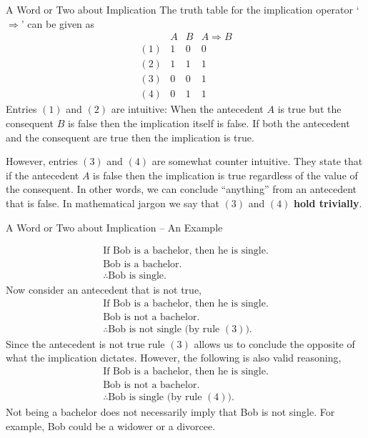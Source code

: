 \documentclass{beamer}
\begin{document}
\begin{frame}{A Word or Two about Implication}
The truth table for the implication operator `$\Rightarrow$' can be given as
{\scriptsize
\[
\begin{array}{lcc|c}
&A & B & A \Rightarrow B\\ \hline
(1)& 1 & 0 & 0\\
(2) & 1 & 1 & 1\\
(3) & 0 & 0 & 1\\
(4) & 0 & 1 & 1
\end{array}
\]
}
Entries $(1)$ and $(2)$ are intuitive: When the antecedent $A$ is true but the consequent $B$ is false then
the implication itself is false.  If both the antecedent and the consequent are true then the implication is true.

\vspace{.1in}

However, entries $(3)$ and $(4)$ are somewhat counter intuitive.  They state that if the antecedent $A$ is false
then the implication is true regardless of the value of the consequent.  In other words, we can conclude ``anything''
from an antecedent that is false.  In mathematical jargon we say that $(3)$ and $(4)$  {\bf hold trivially}.
\end{frame}

\begin{frame}{A Word or Two about Implication -- An Example}

{\scriptsize
\[
\begin{array}{l}
\mbox{If Bob is a bachelor, then he is single.}\\
\mbox{Bob is a bachelor.}\\ \hline
\therefore\mbox{Bob is single.}
\end{array}
\]
}
Now consider an antecedent that is not true,
{\scriptsize
\[
\begin{array}{l}
\mbox{If Bob is a bachelor, then he is single.}\\
\mbox{Bob is not a bachelor.}\\ \hline
\therefore\mbox{Bob is not single (by rule $(3)$).}
\end{array}
\]
}
Since the antecedent is not true rule $(3)$ allows us to conclude the
opposite of what the implication dictates.  However, the following is also
valid reasoning,
{\scriptsize
\[
\begin{array}{l}
\mbox{If Bob is a bachelor, then he is single.}\\
\mbox{Bob is not a bachelor.}\\ \hline
\therefore\mbox{Bob is  single (by rule $(4)$).}
\end{array}
\]
}
Not being a bachelor does not necessarily imply that Bob is not single.  For example,
Bob could be a widower or a divorcee.
\end{frame}
\end{document}
